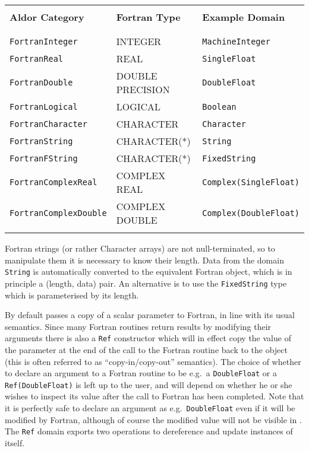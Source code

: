 \begin{center}
{\small
\begin{tabular}{|l|l|l|}\hline
& & \\
{\bf Aldor Category}      & {\bf Fortran Type} & {\bf Example Domain}\\
& & \\
\hline
& & \\
\verb`FortranInteger`       & INTEGER          & \verb`MachineInteger`  \\ 
\verb`FortranReal`          & REAL             & \verb`SingleFloat`\\
\verb`FortranDouble`        & DOUBLE PRECISION & \verb`DoubleFloat`\\
\verb`FortranLogical`       & LOGICAL          & \verb`Boolean`\\
\verb`FortranCharacter`     & CHARACTER        & \verb`Character`\\
\verb`FortranString`        & CHARACTER(*)     & \verb`String`\\
\verb`FortranFString`       & CHARACTER(*)     & \verb`FixedString`\\
\verb`FortranComplexReal`   & COMPLEX REAL     & \verb`Complex(SingleFloat)`\\
\verb`FortranComplexDouble` & COMPLEX DOUBLE   & \verb`Complex(DoubleFloat)`\\
& & \\
\hline
\end{tabular}
}
\end{center}

Fortran strings (or rather Character arrays) are not null-terminated,
so to manipulate them it is necessary to know their length.  Data from
the \asharp{} domain \verb'String' is automatically converted to the
equivalent Fortran object, which is in principle a (length, data)
pair.  An alternative is to use the {\tt FixedString} type which is
parameterised by its length. 

By default \asharp{} passes a copy of a scalar parameter to Fortran,
in line with its usual semantics.  Since many Fortran routines return
results by modifying their arguments there is also a \verb'Ref'
constructor which will in effect copy the value of the parameter at
the end of the call to the Fortran routine back to the \asharp{}
object (this is often referred to as ``copy-in/copy-out'' semantics).
The choice of whether to declare an argument to a Fortran routine to
be e.g.~a \verb'DoubleFloat' or a \verb'Ref(DoubleFloat)' is left up
to the user, and will depend on whether he or she wishes to inspect
its value after the call to Fortran has been completed.  Note that it
is perfectly safe to declare an argument as e.g.~\verb'DoubleFloat'
even if it will be modified by Fortran, although of course the
modified value will not be visible in \asharp.  The \verb'Ref' domain
exports two operations to dereference and update instances of itself.

